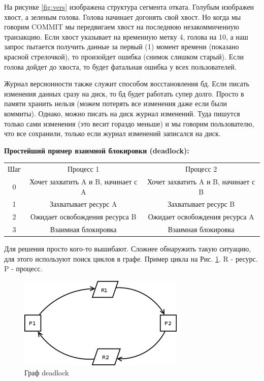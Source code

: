 На рисунке \ref{fig:vers} изображена структура сегмента отката. Голубым изображен хвост, а зеленым голова. Голова начинает догонять свой хвост. Но когда мы говорим COMMIT мы передвигаем хвост на последнюю незакоммиченную транзакцию. Если хвост указывает на временную метку 4, голова на 10, а наш запрос пытается получить данные за первый (1) момент времени (показано красной стрелочкой), то произойдет ошибка (снимок слишком старый). Если голова дойдет до хвоста, то будет фатальная ошибка у всех пользователей. 


Журнал версионности также служит способом восстановления бд. Если писать изменения данных сразу на диск, то бд будет работать супер долго. Просто в памяти хранить нельзя (можем потерять все изменения даже если были коммиты). Однако, можно писать на диск журнал изменений. Туда пишутся только сами изменения (это весит гораздо меньше) и мы говорим пользователю, что все сохранили, только если журнал изменений записался на диск. 

\textbf{Простейший пример взаимной блокировки (deadlock):}

\begin{center}
	\begin{tabular}{c|c | c}
		Шаг	& Процесс 1	& Процесс 2 \\
		0	&Хочет захватить A и B, начинает с A &	Хочет захватить A и B, начинает с B \\
		1&	Захватывает ресурс A &	Захватывает ресурс B \\
		2&	Ожидает освобождения ресурса B	& Ожидает освобождения ресурса A \\
		3	&Взаимная блокировка & Взаимная блокировка
	\end{tabular}
\end{center}

Для решения просто кого-то вышибают. Сложнее обнаружить такую ситуацию, для этого используют поиск циклов в графе. Пример цикла на Рис. \ref{fig:dead}. R - ресурс. P - процесс. 

\begin{figure}[H]
	\centering
	\includegraphics[scale = 0.5]{6/deadlock.png}
	\caption{Граф deadlock}
	\label{fig:dead}
	
\end{figure}
